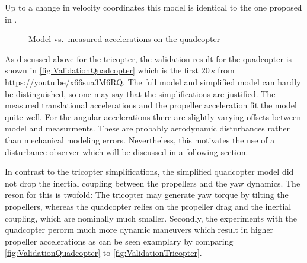 Up to a change in velocity coordinates this model is identical to the one proposed in \cite[eq.\ 7--12]{Mahony:Quadrotor2002}.

\begin{figure}[p]
 \centering
 \footnotesize%
 
 \vspace{-20pt}
 \caption{Model vs.\ measured accelerations on the quadcopter}
 \label{fig:ValidationQuadcopter}
\end{figure}

As discussed above for the tricopter, the validation result for the quadcopter is shown in \autoref{fig:ValidationQuadcopter} which is the first $20\,\unit{s}$ from \url{https://youtu.be/x66sua3M6RQ}.
The full model and simplified model can hardly be distinguished, so one may say that the simplifications are justified.
The measured translational accelerations and the propeller acceleration fit the model quite well.
For the angular accelerations there are slightly varying offsets between model and measurments.
These are probably aerodynamic disturbances rather than mechanical modeling errors.
Nevertheless, this motivates the use of a disturbance observer which will be discussed in a following section.

In contrast to the tricopter simplifications, the simplified quadcopter model did not drop the inertial coupling between the propellers and the yaw dynamics.
The reson for this is twofold:
The tricopter may generate yaw torque by tilting the propellers, whereas the quadcopter relies on the propeller drag and the inertial coupling, which are nominally much smaller.
Secondly, the experiments with the quadcopter perorm much more dynamic maneuvers which result in higher propeller accelerations as can be seen examplary by comparing \autoref{fig:ValidationQuadcopter} to \autoref{fig:ValidationTricopter}.
